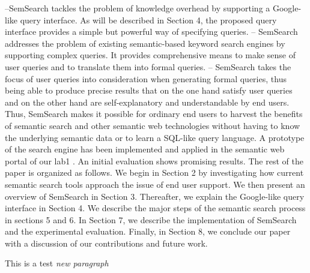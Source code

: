 \documentclass[titlepage]{report}
\begin{document}
--SemSearch tackles the problem of knowledge overhead by supporting a Google-
like query interface. As will be described in Section 4, the proposed query
interface provides a simple but powerful way of specifying queries.
– SemSearch addresses the problem of existing semantic-based keyword search
engines by supporting complex queries. It provides comprehensive means to
make sense of user queries and to translate them into formal queries.
– SemSearch takes the focus of user queries into consideration when generating
formal queries, thus being able to produce precise results that on the one
hand satisfy user queries and on the other hand are self-explanatory and
understandable by end users.
Thus, SemSearch makes it possible for ordinary end users to harvest the
benefits of semantic search and other semantic web technologies without having
to know the underlying semantic data or to learn a SQL-like query language. A
prototype of the search engine has been implemented and applied in the semantic
web portal of our lab1 . An initial evaluation shows promising results.
The rest of the paper is organized as follows. We begin in Section 2 by
investigating how current semantic search tools approach the issue of end user
support. We then present an overview of SemSearch in Section 3. Thereafter,
we explain the Google-like query interface in Section 4. We describe the major
steps of the semantic search process in sections 5 and 6. In Section 7, we describe
the implementation of SemSearch and the experimental evaluation. Finally, in
Section 8, we conclude our paper with a discussion of our contributions and
future work.

This is a test \textit{new paragraph}
\end{document}
